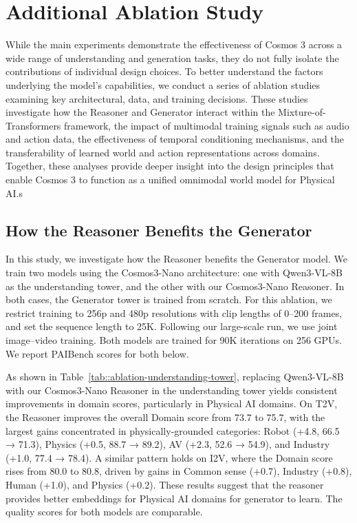\section{Additional Ablation Study}
\label{appendix:training_ablations}

While the main experiments demonstrate the effectiveness of Cosmos 3 across a wide range of understanding and generation tasks, they do not fully isolate the contributions of individual design choices. To better understand the factors underlying the model's capabilities, we conduct a series of ablation studies examining key architectural, data, and training decisions. These studies investigate how the Reasoner and Generator interact within the Mixture-of-Transformers framework, the impact of multimodal training signals such as audio and action data, the effectiveness of temporal conditioning mechanisms, and the transferability of learned world and action representations across domains. Together, these analyses provide deeper insight into the design principles that enable Cosmos 3 to function as a unified omnimodal world model for Physical AI.s

\subsection{How the Reasoner Benefits the Generator}
In this study, we investigate how the Reasoner benefits the Generator model. We train two models using the Cosmos3-Nano architecture: one with Qwen3-VL-8B as the understanding tower, and the other with our Cosmos3-Nano Reasoner. In both cases, the Generator tower is trained from scratch. For this ablation, we restrict training to 256p and 480p resolutions with clip lengths of 0–200 frames, and set the sequence length to 25K. Following our large-scale run, we use joint image–video training. Both models are trained for 90K iterations on 256 GPUs. We report PAIBench scores for both below.



As shown in Table~\ref{tab::ablation-understanding-tower}, replacing Qwen3-VL-8B with our Cosmos3-Nano Reasoner in the understanding tower yields consistent improvements in domain scores, particularly in Physical AI domains. On T2V, the Reasoner improves the overall Domain score from 73.7 to 75.7, with the largest gains concentrated in physically-grounded categories: Robot (+4.8, 66.5 → 71.3), Physics (+0.5, 88.7 → 89.2), AV (+2.3, 52.6 → 54.9), and Industry (+1.0, 77.4 → 78.4). A similar pattern holds on I2V, where the Domain score rises from 80.0 to 80.8, driven by gains in Common sense (+0.7), Industry (+0.8), Human (+1.0), and Physics (+0.2). These results suggest that the reasoner provides better embeddings for Physical AI domains for generator to learn. The quality scores for both models are comparable.

